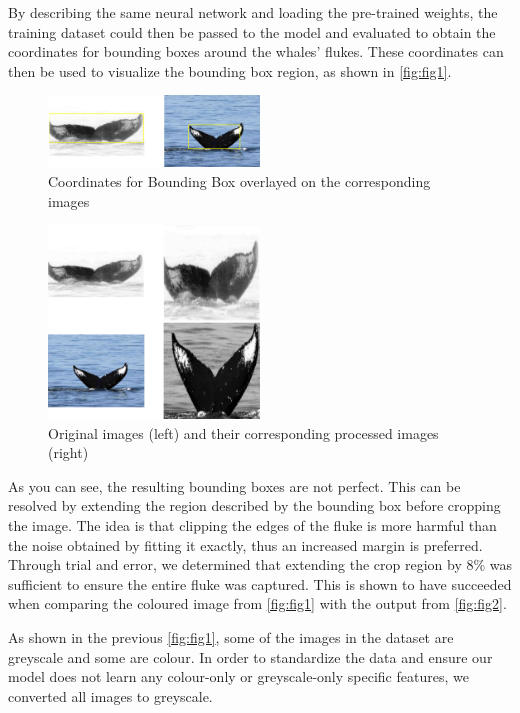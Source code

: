 \documentclass[paper=a4, fontsize=11pt]{scrartcl}
\numberwithin{equation}{section}		%
\numberwithin{table}{section}				%
\begin{document}
By describing the same neural network and loading the pre-trained weights, the training dataset could then be passed to the model and evaluated to obtain the coordinates for bounding boxes around the whales' flukes. These coordinates can then be used to visualize the bounding box region, as shown in \autoref{fig:fig1}.

\begin{figure}[h]
    \centering
    \includegraphics[width=0.5\textwidth]{BoundingBoxExample.png}
    \caption{Coordinates for Bounding Box overlayed on the corresponding images}
    \label{fig:fig1}
\end{figure}

\begin{figure}[h]
    \centering
    \includegraphics[width=0.5\textwidth]{ProcessedImages.png}
    \caption{Original images (left) and their corresponding processed images (right)}
    \label{fig:fig2}
\end{figure}

As you can see, the resulting bounding boxes are not perfect. This can be resolved by extending the region described by the bounding box before cropping the image. The idea is that clipping the edges of the fluke is more harmful than the noise obtained by fitting it exactly, thus an increased margin is preferred. Through trial and error, we determined that extending the crop region by 8\% was sufficient to ensure the entire fluke was captured. This is shown to have succeeded when comparing the coloured image from \autoref{fig:fig1} with the output from \autoref{fig:fig2}.

As shown in the previous \autoref{fig:fig1}, some of the images in the dataset are greyscale and some are colour. In order to standardize the data and ensure our model does not learn any colour-only or greyscale-only specific features, we converted all images to greyscale.
\end{document}
